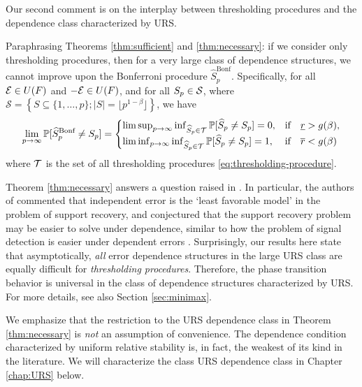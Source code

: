 Our second comment is on the interplay between thresholding procedures and the dependence class characterized by URS.
\begin{remark} \label{rmk:dependence-assumptions}
Paraphrasing Theorems \ref{thm:sufficient} and \ref{thm:necessary}: 
if we consider only thresholding procedures, then for a very large class of dependence structures, we cannot improve upon the Bonferroni procedure $\widehat{S}_p^{\text{Bonf}}$. 
Specifically, for all ${\cal E}\in U(F)$ and ${-\cal E}\in U(F)$, and for all $S_p\in {\cal S}$, where $\mathcal{S} = \left\{S\subseteq\{1,\ldots,p\};|S|=\lfloor p^{1-\beta}\rfloor\right\}$, we have
\begin{equation}
    \lim_{p\to\infty} \P[\widehat{S}_p^{\text{Bonf}}\neq S_p]
    = \begin{cases}
    \limsup_{p\to\infty} \inf_{\widehat{S}_p \in {\cal T}} \P[\widehat{S}_p\neq S_p] = 0, & \text{if}\quad \underline{r} > g(\beta),\\
    \liminf_{p\to\infty} \inf_{\widehat{S}_p \in {\cal T}} \P[\widehat{S}_p\neq S_p] = 1, & \text{if}\quad \overline{r} < g(\beta)\\
    \end{cases}
\end{equation}
where $\cal T$ is the set of all thresholding procedures \eqref{eq:thresholding-procedure}. 

Theorem \ref{thm:necessary} answers a question raised in \citet{butucea2018variable}.
In particular, the authors of \citep{butucea2018variable} commented that independent error is the  `least favorable model' in the problem of support recovery, and 
conjectured that the support recovery problem may be easier to solve under dependence, similar to how the problem of signal detection is easier under dependent 
errors \citep{hall2010innovated}. 
Surprisingly, our results here state that asymptotically, \emph{all} error dependence structures in the large URS class are equally difficult for \emph{thresholding procedures}. Therefore, the phase transition behavior is universal in the class of dependence structures characterized by URS.
For more details, see also Section \ref{sec:minimax}.
\end{remark}

\begin{remark} We emphasize that the restriction to the URS dependence class in Theorem \ref{thm:necessary} is 
\emph{not} an assumption of convenience. 
The dependence condition characterized by uniform relative stability is, in fact, the weakest of its kind in the literature.
We will characterize the class URS dependence class in Chapter \ref{chap:URS} below.
\end{remark}

